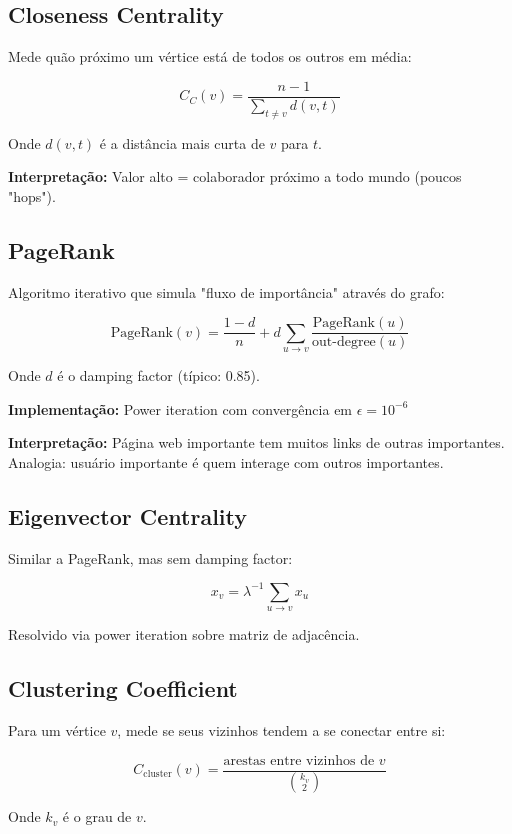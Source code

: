 \documentclass[12pt,a4paper]{article}
\begin{document}
\subsection{Closeness Centrality}

Mede quão próximo um vértice está de todos os outros em média:

\[
C_C(v) = \frac{n-1}{\sum_{t \neq v} d(v,t)}
\]

Onde $d(v,t)$ é a distância mais curta de $v$ para $t$.

\textbf{Interpretação:} Valor alto = colaborador próximo a todo mundo (poucos "hops").

\subsection{PageRank}

Algoritmo iterativo que simula "fluxo de importância" através do grafo:

\[
\text{PageRank}(v) = \frac{1-d}{n} + d \sum_{u \to v} \frac{\text{PageRank}(u)}{\text{out-degree}(u)}
\]

Onde $d$ é o damping factor (típico: 0.85).

\textbf{Implementação:} Power iteration com convergência em $\epsilon = 10^{-6}$

\textbf{Interpretação:} Página web importante tem muitos links de outras importantes. Analogia: usuário importante é quem interage com outros importantes.

\subsection{Eigenvector Centrality}

Similar a PageRank, mas sem damping factor:

\[
x_v = \lambda^{-1} \sum_{u \to v} x_u
\]

Resolvido via power iteration sobre matriz de adjacência.

\subsection{Clustering Coefficient}

Para um vértice $v$, mede se seus vizinhos tendem a se conectar entre si:

\[
C_{\text{cluster}}(v) = \frac{\text{arestas entre vizinhos de } v}{\binom{k_v}{2}}
\]

Onde $k_v$ é o grau de $v$.
\end{document}
